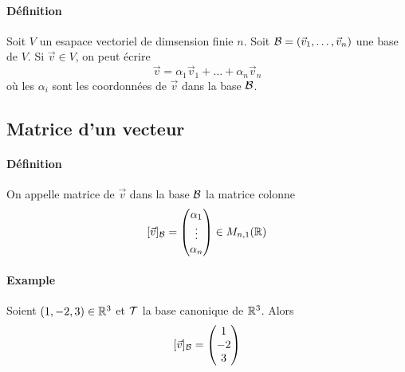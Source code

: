 {\paragraph{Définition} Soit $V$ un esapace vectoriel de dimsension finie $n$. Soit $\mathcal{B} = (\vec{v}_1, \ldots, \vec{v}_n)$ une base de $V$. Si $\vec{v} \in V$, on peut écrire 
$$\vec{v} = \alpha_1 \vec{v}_1 + \ldots + \alpha_n \vec{v}_n$$
où les $\alpha_i$ sont les coordonnées de $\vec{v}$ dans la base $\mathcal{B}$.

%
\subsection{Matrice d'un vecteur}
%
\paragraph{Définition} On appelle  matrice de $\vec{v}$ dans la base $\mathcal{B}$ la matrice colonne 
$$[\vec{v}]_{\mathcal{B}} = 
\begin{pmatrix} 
  \alpha_1 \\ 
  \vdots \\ 
  \alpha_n 
\end{pmatrix} 
\in M_{n, 1}(\mathbb{R})$$

\paragraph{Example} Soient $(1, -2, 3) \in \mathbb{R}^3$ et $\mathcal{T}$ la base canonique de $\mathbb{R}^3$. Alors
$$[\vec{v}]_{\mathcal{B}} = 
\begin{pmatrix} 
  1 \\ 
  -2 \\ 
  3 
\end{pmatrix}$$

}
